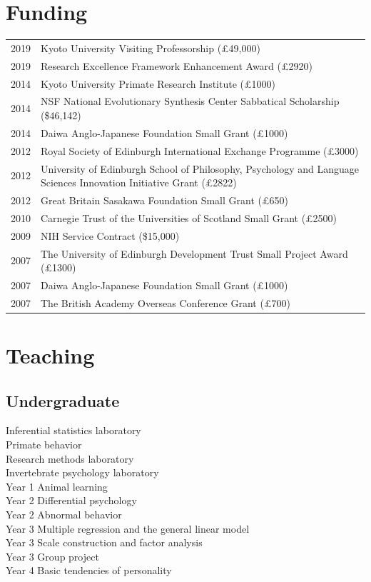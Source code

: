 \documentclass[11pt]{article}
\begin{document}
\section*{Funding}
\begin{tabular}{p{3cm}p{12cm}}
  2019 & Kyoto University Visiting Professorship (£49,000) \\
  2019 & Research Excellence Framework Enhancement Award (£2920) \\
  2014 & Kyoto University Primate Research Institute (£1000) \\
  2014 & NSF National Evolutionary Synthesis Center Sabbatical Scholarship (\$46,142) \\
  2014 & Daiwa Anglo-Japanese Foundation Small Grant (£1000) \\
  2012 & Royal Society of Edinburgh International Exchange Programme (£3000) \\
  2012 & University of Edinburgh School of Philosophy, Psychology and
         Language Sciences Innovation Initiative Grant (£2822) \\
  2012 & Great Britain Sasakawa Foundation Small Grant (£650) \\
  2010 & Carnegie Trust of the Universities of Scotland Small Grant
         (£2500) \\
  2009 & NIH Service Contract (\$15,000) \\
  2007 & The University of Edinburgh Development Trust Small Project Award
         (£1300) \\
  2007 & Daiwa Anglo-Japanese Foundation Small Grant (£1000) \\
  2007 & The British Academy Overseas Conference Grant (£700)
\end{tabular}

\section*{Teaching}
\subsection*{Undergraduate}
Inferential statistics laboratory \\
Primate behavior \\
Research methods laboratory \\
Invertebrate psychology laboratory \\
Year 1 Animal learning \\
Year 2 Differential psychology \\
Year 2 Abnormal behavior \\
Year 3 Multiple regression and the general linear model \\
Year 3 Scale construction and factor analysis \\
Year 3 Group project \\
Year 4 Basic tendencies of personality
\end{document}
